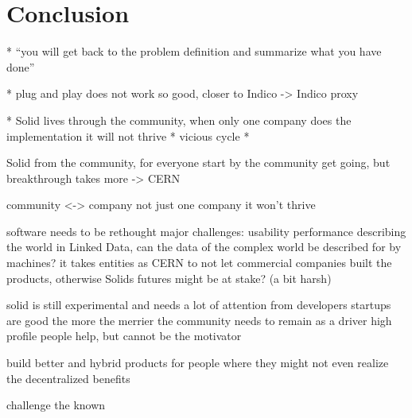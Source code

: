 \chapter{Conclusion}

* “you will get back to the problem definition and summarize what you have done”

* plug and play does not work so good, closer to Indico -> Indico proxy

* Solid lives through the community, when only one company does the implementation it will not thrive
* vicious cycle
* 

Solid from the community, for everyone
start by the community
get going, but breakthrough takes more -> CERN

community <-> company
not just one company it won't thrive

software needs to be rethought
major challenges:
    usability
    performance
    describing the world in Linked Data, can the data of the complex world be described for by machines?
it takes entities as CERN to not let commercial companies built the products, otherwise Solids futures might be at stake? (a bit harsh)

solid is still experimental and needs a lot of attention from developers
startups are good
the more the merrier
the community needs to remain as a driver
high profile people help, but cannot be the motivator

build better and hybrid products for people where they might not even realize the decentralized benefits

challenge the known